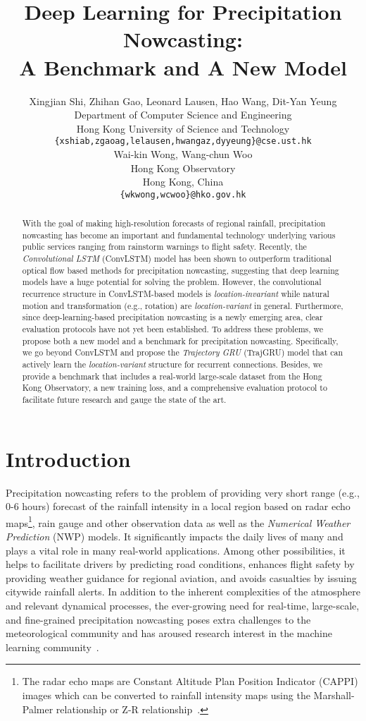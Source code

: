 \documentclass{article}
\title{Deep Learning for Precipitation Nowcasting:\\A Benchmark and A New Model}
\author{
  Xingjian Shi,
  Zhihan Gao,
  Leonard Lausen,
  Hao Wang,
  Dit-Yan Yeung\\
  Department of Computer Science and Engineering\\
  Hong Kong University of Science and Technology\\
  \texttt{\{xshiab,zgaoag,lelausen,hwangaz,dyyeung\}@cse.ust.hk} \\
  \And
  Wai-kin Wong,
  Wang-chun Woo\\
  Hong Kong Observatory\\
  Hong Kong, China\\
  \texttt{\{wkwong,wcwoo\}@hko.gov.hk} \\
}
\begin{document}



\maketitle

\begin{abstract}
  With the goal of making high-resolution forecasts of regional rainfall,
  precipitation nowcasting has become an important and fundamental technology
  underlying various public services ranging from rainstorm warnings to flight
  safety. Recently, the \emph{Convolutional LSTM} (ConvLSTM) model has been
  shown to outperform traditional optical flow based methods for precipitation
  nowcasting, suggesting that deep learning models have a huge potential for
  solving the problem. However, the convolutional recurrence structure in
  ConvLSTM-based models is \emph{location-invariant} while natural motion and
  transformation (e.g., rotation) are \emph{location-variant} in general.
  Furthermore, since deep-learning-based precipitation nowcasting is a newly
  emerging area, clear evaluation protocols have not yet been established. To
  address these problems, we propose both a new model and a benchmark for
  precipitation nowcasting. Specifically, we go beyond ConvLSTM and propose the
  \emph{Trajectory GRU} (TrajGRU) model that can actively learn the
  \emph{location-variant} structure for recurrent connections. Besides, we
  provide a benchmark that includes a real-world large-scale dataset from the
  Hong Kong Observatory, a new training loss, and a comprehensive evaluation
  protocol to facilitate future research and gauge the state of the art.
\end{abstract}


\section{Introduction}\label{sec:intro}
Precipitation nowcasting refers to the problem of providing very short range
(e.g., 0-6 hours) forecast of the rainfall intensity in a local region based on radar echo maps\footnote{The radar echo maps are Constant Altitude
  Plan Position Indicator (CAPPI) images which can be converted to rainfall
  intensity maps using the Marshall-Palmer relationship or Z-R
  relationship~\cite{marshall1948distribution}.}, rain gauge and other observation data as well as the \emph{Numerical Weather Prediction} (NWP) models. It significantly impacts the
daily lives of many and plays a vital role in many real-world applications.
Among other possibilities, it helps to facilitate drivers by predicting road
conditions, enhances flight safety by providing weather guidance for regional
aviation, and avoids casualties by issuing citywide rainfall alerts. In addition
to the inherent complexities of the atmosphere and relevant dynamical processes,
the ever-growing need for real-time, large-scale, and fine-grained precipitation
nowcasting poses extra challenges to the meteorological community and has
aroused research interest in the machine learning
community~\cite{xingjian2015convolutional,sun2014use}.
\end{document}
